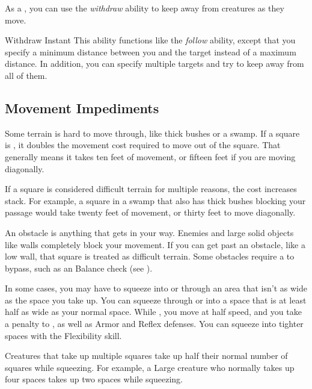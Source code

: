          As a , you can use the \textit{withdraw} ability to keep away from creatures as they move.

        \begin{instantability}{Withdraw}
            \label{Withdraw}
            Instant
            \rankline
            This ability functions like the \textit{follow} ability, except that you specify a minimum distance between you and the target instead of a maximum distance.
            In addition, you can specify multiple targets and try to keep away from all of them.
        \end{instantability}

    \subsection{Movement Impediments}

        \label{Difficult Terrain}
        Some terrain is hard to move through, like thick bushes or a swamp.
        If a square is , it doubles the movement cost required to move out of the square.
        That generally means it takes ten feet of movement, or fifteen feet if you are moving diagonally.

        If a square is considered difficult terrain for multiple reasons, the cost increases stack.
        For example, a square in a swamp that also has thick bushes blocking your passage would take twenty feet of movement, or thirty feet to move diagonally.

        An obstacle is anything that gets in your way. Enemies and large solid objects like walls completely block your movement. If you can get past an obstacle, like a low wall, that square is treated as difficult terrain. Some obstacles require a  to bypass, such as an Balance check (see ).

        \label{Squeezing}
        In some cases, you may have to squeeze into or through an area that isn't as wide as the space you take up.
        You can squeeze through or into a space that is at least half as wide as your normal space.
        While \squeezing, you move at half speed, and you take a  penalty to , as well as Armor and Reflex defenses.
        You can squeeze into tighter spaces with the Flexibility skill.

        Creatures that take up multiple squares take up half their normal number of squares while squeezing. For example, a Large creature who normally takes up four spaces takes up two spaces while squeezing.

